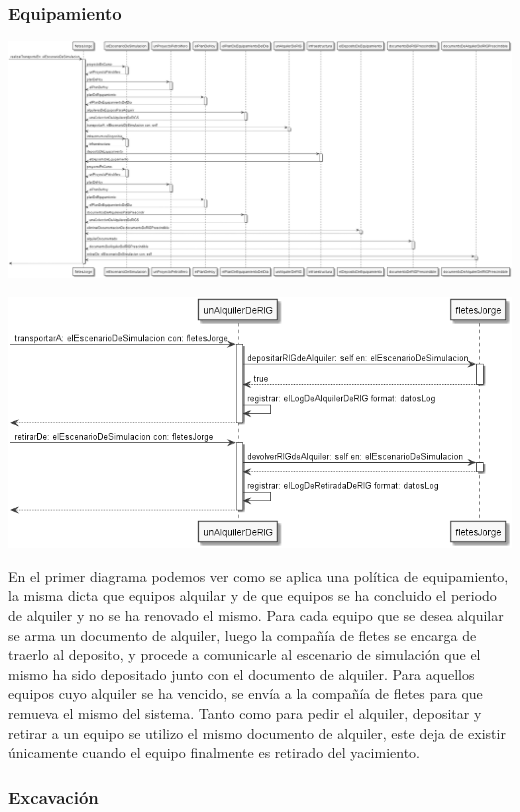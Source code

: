 \documentclass[10pt,a4paper]{article}
\begin{document}
\subsubsection{Equipamiento}

\centerline{\includegraphics[scale=0.25]{images/secuenciaEquipamiento.png}}
\vspace{0.25cm}
\centerline{\includegraphics[scale=0.5]{images/secuenciaEquipamientoTransportar.png}}

En el primer diagrama podemos ver como se aplica una política de equipamiento, la misma dicta que equipos alquilar y de que equipos se ha concluido el periodo de alquiler y no se ha renovado el mismo. Para cada equipo que se desea alquilar se arma un documento de alquiler, luego la compañía de fletes se encarga de traerlo al deposito, y procede a comunicarle al escenario de simulación que el mismo ha sido depositado junto con el documento de alquiler. Para aquellos equipos cuyo alquiler se ha vencido, se envía a la compañía de fletes para que remueva el mismo del sistema. Tanto como para pedir el alquiler, depositar y retirar a un equipo se utilizo el mismo documento de alquiler, este deja de existir únicamente cuando el equipo finalmente es retirado del yacimiento.

\subsubsection{Excavación}
\end{document}
